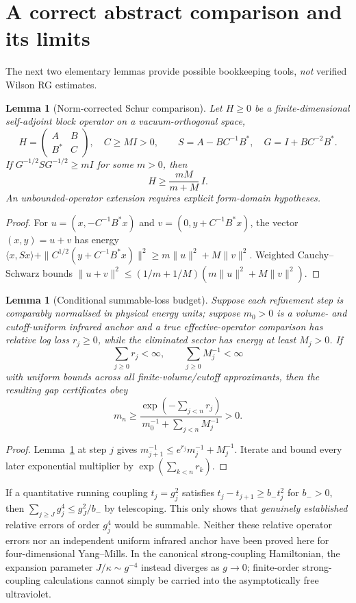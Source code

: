 \documentclass[11pt,a4paper]{article}
\newtheorem{lemma}[theorem]{Lemma}
\theoremstyle{remark}
\begin{document}
\section{A correct abstract comparison and its limits}
The next two elementary lemmas provide possible
bookkeeping tools, \emph{not} verified Wilson RG estimates.

\begin{lemma}[Norm-corrected Schur comparison]\label{lem:schur}
Let $H\ge0$ be a finite-dimensional self-adjoint block
operator on a vacuum-orthogonal space,
\[
H=\begin{pmatrix}A&B\\B^*&C\end{pmatrix},
\quad C\ge MI>0,\qquad
S=A-BC^{-1}B^*,\quad G=I+BC^{-2}B^*.
\]
If $G^{-1/2}SG^{-1/2}\ge mI$ for some $m>0$,
then
\[
\boxed{\quad H\ge\frac{mM}{m+M}\,I.\quad}
\]
An unbounded-operator extension requires explicit
form-domain hypotheses.
\end{lemma}
\begin{proof}
For $u=(x,-C^{-1}B^*x)$ and
$v=(0,y+C^{-1}B^*x)$, the vector $(x,y)=u+v$
has energy
$\langle x,Sx\rangle+
\|C^{1/2}(y+C^{-1}B^*x)\|^2
\ge m\|u\|^2+M\|v\|^2$.
Weighted Cauchy--Schwarz bounds
$\|u+v\|^2\le(1/m+1/M)
(m\|u\|^2+M\|v\|^2)$.
\end{proof}

\begin{lemma}[Conditional summable-loss budget]\label{lem:budget}
Suppose each refinement step is comparably
normalised in \emph{physical energy units};
suppose $m_0>0$ is a volume- and cutoff-uniform
infrared anchor and a true effective-operator comparison
has relative log loss $r_j\ge0$, while the eliminated
sector has energy at least $M_j>0$. If
\[
\sum_{j\ge0}r_j<\infty,\qquad
\sum_{j\ge0}M_j^{-1}<\infty
\]
with uniform bounds across all finite-volume/cutoff
approximants, then the resulting gap certificates obey
\[
\boxed{\quad
m_n\ge
\frac{\exp(-\sum_{j<n}r_j)}
     {m_0^{-1}+\sum_{j<n}M_j^{-1}}>0.
\quad}
\]
\end{lemma}
\begin{proof}
Lemma~\ref{lem:schur} at step $j$ gives
$m_{j+1}^{-1}\le e^{r_j}m_j^{-1}+M_j^{-1}$.
Iterate and bound every later exponential multiplier
by $\exp(\sum_{k<n}r_k)$.
\end{proof}
If a quantitative running coupling $t_j=g_j^2$
satisfies $t_j-t_{j+1}\ge b_-t_j^2$
for $b_->0$, then
$\sum_{j\ge J}g_j^4\le g_J^2/b_-$
by telescoping. This only shows that
\emph{genuinely established} relative errors of
order $g_j^4$ would be summable. Neither
these relative operator errors nor an independent
uniform infrared anchor have been proved here
for four-dimensional Yang--Mills.
In the canonical strong-coupling Hamiltonian,
the expansion parameter $J/\kappa\sim g^{-4}$
instead diverges as $g\to0$; finite-order
strong-coupling calculations cannot simply be
carried into the asymptotically free ultraviolet.
\end{document}
